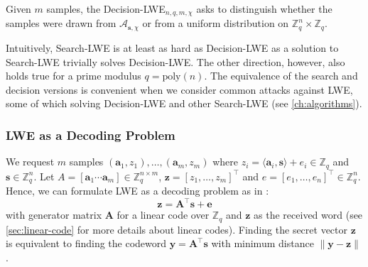\begin{definition}
    Given $m$ samples, the Decision-LWE$_{n, q, m, \chi}$ asks to distinguish whether the samples were drawn from $\mathcal{A}_{\mathbf{s}, \chi}$ or from a uniform distribution on $\mathbb{Z}_q^n \times \mathbb{Z}_q$.
\end{definition}

Intuitively, Search-LWE is at least as hard as Decision-LWE as a solution to Search-LWE trivially solves Decision-LWE. The other direction, however, also holds true \cite{Reg09} for a prime modulus $q=\text{poly}(n)$. %
The equivalence of the search and decision versions is convenient when we consider common attacks against LWE, some of which solving Decision-LWE and other Search-LWE (see \cref{ch:algorithms}).

% 


\subsubsection{LWE as a Decoding Problem} \label{sec:lwe-decoding}
We request $m$ samples $(\mathbf{a}_1, z_1), \ldots, (\mathbf{a}_m, z_m)$ where $z_i = \langle \mathbf{a}_i, \mathbf{s} \rangle + e_i \in \mathbb{Z}_q$ and $\mathbf{s} \in \mathbb{Z}_q^n$. Let $A = \left[ \mathbf{a}_1 \cdots \mathbf{a}_m\right] \in \mathbb{Z}_q^{n\times m}$, $\mathbf{z} = \left[z_1, \ldots, z_m\right]^\intercal$ and $e = \left[e_1, \ldots, e_n\right]^\intercal \in \mathbb{Z}_q^n$. Hence, we can formulate LWE as a decoding problem as in \cite{GJS15}:
\begin{equation} \label{eq:lwe-decoding}
    \mathbf{z} =  \mathbf{A}^\intercal \mathbf{s} + \mathbf{e}
\end{equation}
with generator matrix $\mathbf{A}$ for a linear code over $\mathbb{Z}_q$ and $\mathbf{z}$ as the received word (see \cref{sec:linear-code} for more details about linear codes). Finding the secret vector $\mathbf{z}$ is equivalent to finding the codeword $\mathbf{y} = \mathbf{A}^\intercal\mathbf{s}$ with minimum distance $\| \mathbf{y} - \mathbf{z} \|$.

